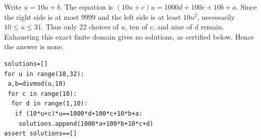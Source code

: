 Write $ u=10a+b $. The equation is $(10u+c)u=1000d+100c+10b+a $. Since the right side is at most $ 9999 $ and the left side is at least $ 10u^2 $, necessarily $ 10\le u\le31 $. Thus only 22 choices of $ u $, ten of $ c $, and nine of $ d $ remain. Exhausting this exact finite domain gives no solutions, as certified below. Hence the answer is $\boxed{\text{none}}$.
\begin{verbatim}
solutions=[]
for u in range(10,32):
 a,b=divmod(u,10)
 for c in range(10):
  for d in range(1,10):
   if (10*u+c)*u==1000*d+100*c+10*b+a:
    solutions.append(1000*a+100*b+10*c+d)
assert solutions==[]
\end{verbatim}
